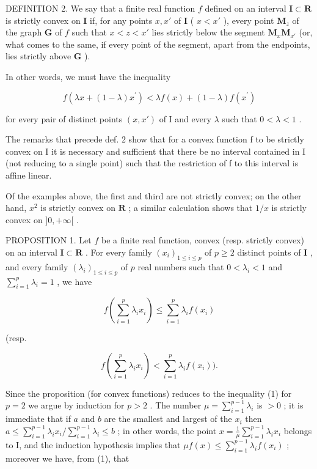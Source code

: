 DEFINITION 2. We say that a finite real function \(f\) defined on an interval \(\mathbf{I} \subset \mathbf{R}\) is strictly convex on \(\mathbf{I}\) if, for any points \(x, x'\) of \(\mathbf{I}\) ( \(x < x'\) ), every point \(\mathbf{M}_z\) of the graph \(\mathbf{G}\) of \(f\) such that \(x < z < x'\) lies strictly below the segment \(\mathbf{M}_x\mathbf{M}_{x'}\) (or, what comes to the same, if every point of the segment, apart from the endpoints, lies strictly above \(\mathbf{G}\) ).

In other words, we must have the inequality

\[
f (\lambda x + (1 - \lambda) x ^ {\prime}) <   \lambda f (x) + (1 - \lambda) f (x ^ {\prime})\tag{2}
\]

for every pair of distinct points \((x, x')\) of I and every \(\lambda\) such that \(0 < \lambda < 1\) .

The remarks that precede def. 2 show that for a convex function f to be strictly convex on I it is necessary and sufficient that there be no interval contained in I (not reducing to a single point) such that the restriction of f to this interval is affine linear.

Of the examples above, the first and third are not strictly convex; on the other hand, \(x^2\) is strictly convex on \(\mathbf{R}\) ; a similar calculation shows that \(1 / x\) is strictly convex on \(]0, +\infty[\) .

PROPOSITION 1. Let \(f\) be a finite real function, convex (resp. strictly convex) on an interval \(\mathbf{I} \subset \mathbf{R}\) . For every family \((x_i)_{1 \leqslant i \leqslant p}\) of \(p \geqslant 2\) distinct points of \(\mathbf{I}\) , and every family \((\lambda_i)_{1 \leqslant i \leqslant p}\) of \(p\) real numbers such that \(0 < \lambda_i < 1\) and \(\sum_{i=1}^{p} \lambda_i = 1\) , we have

\[
f \left(\sum_ {i = 1} ^ {p} \lambda_ {i} x _ {i}\right) \leqslant \sum_ {i = 1} ^ {p} \lambda_ {i} f (x _ {i})\tag{3}
\]

(resp.

\[
f \left(\sum_ {i = 1} ^ {p} \lambda_ {i} x _ {i}\right) <   \sum_ {i = 1} ^ {p} \lambda_ {i} f (x _ {i})).\tag{4}
\]

Since the proposition (for convex functions) reduces to the inequality (1) for \(p = 2\) we argue by induction for \(p > 2\) . The number \(\mu = \sum_{i=1}^{p-1} \lambda_i\) is \(> 0\) ; it is immediate that if \(a\) and \(b\) are the smallest and largest of the \(x_i\) then \(a \leqslant \sum_{i=1}^{p-1} \lambda_i x_i / \sum_{i=1}^{p-1} \lambda_i \leqslant b\) ; in other words, the point \(x = \frac{1}{\mu} \sum_{i=1}^{p-1} \lambda_i x_i\) belongs to I, and the induction hypothesis implies that \(\mu f(x) \leqslant \sum_{i=1}^{p-1} \lambda_i f(x_i)\) ; moreover we have, from (1), that

